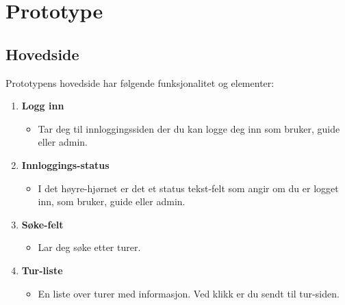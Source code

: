 \documentclass[../doc]{subfiles}
\begin{document}
\section{Prototype}
\subsection{Hovedside}
Prototypens hovedside har følgende funksjonalitet og elementer:

\begin{enumerate}
    \item \textbf{Logg inn}
    \begin{itemize}
        \item Tar deg til innloggingssiden der du kan logge deg inn som bruker, guide eller admin.
    \end{itemize}

    \item \textbf{Innloggings-status}
    \begin{itemize}
        \item I det høyre-hjørnet er det et status tekst-felt som angir om du er logget inn, som bruker, guide eller admin.
    \end{itemize}

    \item \textbf{Søke-felt}
    \begin{itemize}
        \item Lar deg søke etter turer.
    \end{itemize}

    \item \textbf{Tur-liste}
    \begin{itemize}
        \item En liste over turer med informasjon. Ved klikk er du sendt til tur-siden.
    \end{itemize}
\end{enumerate}
\end{document}
